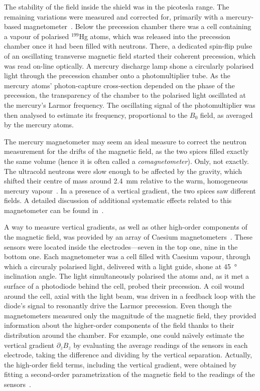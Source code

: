 The stability of the field inside the shield was in the picotesla range. The remaining variations were measured and corrected for, primarily with a mercury-based magnetometer~\cite{FertlThesis,Komposch2017}. Below the precession chamber there was a cell containing a vapour of polarised $^{199}$Hg atoms, which was released into the precession chamber once it had been filled with neutrons.
There, a dedicated spin-flip pulse of an oscillating transverse magnetic field started their coherent precession, which was read on-line optically. A mercury discharge lamp shone a circularly polarised light through the precession chamber onto a photomultiplier tube. As the mercury atoms' photon-capture cross-section depended on the phase of the precession, the transparency of the chamber to the polarised light oscillated at the mercury's Larmor frequency. The oscillating signal of the photomultiplier was then analysed to estimate its frequency, proportional to the $B_0$ field, as averaged by the mercury atoms.

The mercury magnetometer may seem an ideal measure to correct the neutron measurement for the drifts of the magnetic field, as the two spices filled exactly the same volume (hence it is often called a \emph{comagnetometer}). Only, not exactly. The ultracold neutrons were slow enough to be affected by the gravity, which shifted their centre of mass around \SI{2.4}{\milli\meter} relative to the warm, homogeneous mercury vapour~\cite{Afach2014magmoment}. In a presence of a vertical gradient, the two spices saw different fields. A detailed discussion of additional systematic effects related to this magnetometer can be found in~\cite{Afach2014magmoment}.

A way to measure vertical gradients, as well as other high-order components of the magnetic field, was provided by an array of Caesium magnetometers~\cite{Groeger2005}. These sensors were located inside the electrodes---seven in the top one, nine in the bottom one. Each magnetometer was a cell filled with Caesium vapour, through which a circuraly polarised light, delivered with a light guide, shone at \SI{45}{\degree} inclination angle. The light simultaneously polarised the atoms and, as it met a surface of a photodiode behind the cell, probed their precession. A coil wound around the cell, axial with the light beam, was driven in a feedback loop with the diode's signal to resonantly drive the Larmor precession. Even though the magnetometers measured only the magnitude of the magnetic field, they provided information about the higher-order components of the field thanks to their distribution around the chamber. For example, one could na\"\i vely estimate the vertical gradient $\partial_z B_z$ by evaluating the average readings of the sensors in each electrode, taking the difference and dividing by the vertical separation. Actually, the high-order field terms, including the vertical gradient, were obtained by fitting a second-order parametrization of the magnetic field to the readings of the sensors~\cite{WurstenThesis}.

